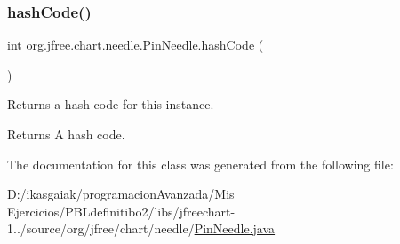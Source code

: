 \subsubsection{\texorpdfstring{hash\+Code()}{hashCode()}}
{\footnotesize\ttfamily int org.\+jfree.\+chart.\+needle.\+Pin\+Needle.\+hash\+Code (\begin{DoxyParamCaption}{ }\end{DoxyParamCaption})}

Returns a hash code for this instance.

\begin{DoxyReturn}{Returns}
A hash code. 
\end{DoxyReturn}


The documentation for this class was generated from the following file\+:\begin{DoxyCompactItemize}
\item 
D\+:/ikasgaiak/programacion\+Avanzada/\+Mis Ejercicios/\+P\+B\+Ldefinitibo2/libs/jfreechart-\/1../source/org/jfree/chart/needle/\mbox{\hyperlink{_pin_needle_8java}{Pin\+Needle.\+java}}\end{DoxyCompactItemize}
